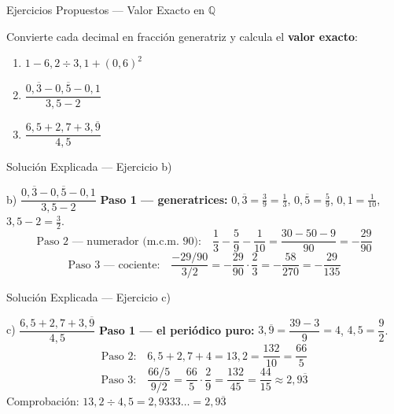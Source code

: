 \documentclass[aspectratio=169]{beamer}
\begin{document}
\begin{frame}{Ejercicios Propuestos — Valor Exacto en $\mathbb{Q}$}
  \begin{mwejercicio}
    Convierte cada decimal en fracción generatriz y calcula el
    \textbf{valor exacto}:
    \begin{enumerate}
      \item[a)] $1 - 6{,}2 \div 3{,}1 + (0{,}6)^{2}$
      \item[b)] $\dfrac{0{,}\overline{3} - 0{,}\overline{5} - 0{,}1}
                       {3{,}5 - 2}$
      \item[c)] $\dfrac{6{,}5 + 2{,}7 + 3{,}\overline{9}}{4{,}5}$
    \end{enumerate}
  \end{mwejercicio}
\end{frame}

\begin{frame}{Solución Explicada — Ejercicio b)}
  \mwtopanchoroff
  \begin{block}{b) \; $\dfrac{0{,}\overline{3} - 0{,}\overline{5} - 0{,}1}
                                  {3{,}5 - 2}$}
    \textbf{Paso 1 — generatrices:}
    $0{,}\overline{3} = \frac{3}{9} = \frac{1}{3}$,\quad
    $0{,}\overline{5} = \frac{5}{9}$,\quad
    $0{,}1 = \frac{1}{10}$,\quad
    $3{,}5 - 2 = \frac{3}{2}$.
    \[
      \text{Paso 2 — numerador (m.c.m.\ } 90\text{):}\quad
      \frac{1}{3} - \frac{5}{9} - \frac{1}{10}
      = \frac{30 - 50 - 9}{90}
      = -\frac{29}{90}
    \]
    \[
      \text{Paso 3 — cociente:}\quad
      \frac{-29/90}{3/2}
      = -\frac{29}{90} \cdot \frac{2}{3}
      = -\frac{58}{270}
      = -\frac{29}{135}
    \]
  \end{block}
  \mwtopanchoron
\end{frame}

\begin{frame}{Solución Explicada — Ejercicio c)}
  \mwtopanchoroff
  \begin{block}{c) \; $\dfrac{6{,}5 + 2{,}7 + 3{,}\overline{9}}{4{,}5}$}
    \textbf{Paso 1 — el periódico puro:}
    $3{,}\overline{9} = \dfrac{39 - 3}{9} = 4$,
    \qquad $4{,}5 = \dfrac{9}{2}$.
    \[
      \text{Paso 2:}\quad 6{,}5 + 2{,}7 + 4 = 13{,}2 = \frac{132}{10}
      = \frac{66}{5}
    \]
    \[
      \text{Paso 3:}\quad \frac{66/5}{9/2}
      = \frac{66}{5} \cdot \frac{2}{9}
      = \frac{132}{45}
      = \frac{44}{15} \approx 2{,}9\overline{3}
    \]
    \small Comprobación: $13{,}2 \div 4{,}5 = 2{,}9333\dots
    = 2{,}9\overline{3}$ \;\checkmark
  \end{block}
  \mwtopanchoron
\end{frame}
\end{document}
